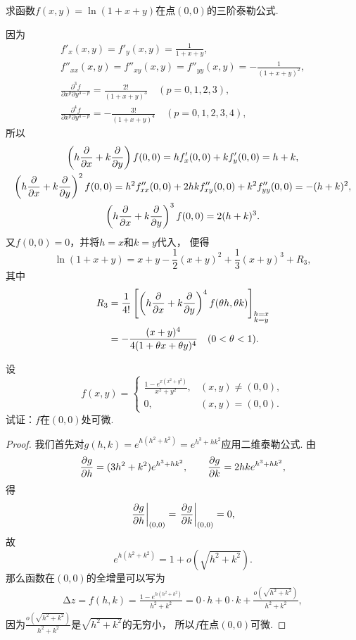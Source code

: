 \begin{example}
求函数\(f(x,y) = \ln(1+x+y)\)在点\((0,0)\)的三阶泰勒公式.
\begin{solution}
\def\oprt#1{\left(h\pdv{x}+k\pdv{y}\right)\ifx\relax#1\relax\else^{#1}\fi}
因为\begin{gather*}
	f'_x(x,y) = f'_y(x,y) = \frac{1}{1+x+y}, \\
	f''_{xx}(x,y) = f''_{xy}(x,y) = f''_{yy}(x,y) = -\frac{1}{(1+x+y)^2}, \\
	\frac{\partial^3 f}{\partial x^p \partial y^{3-p}}
	= \frac{2!}{(1+x+y)^3}
	\quad(p=0,1,2,3), \\
	\frac{\partial^4 f}{\partial x^p \partial y^{4-p}}
	= -\frac{3!}{(1+x+y)^4}
	\quad(p=0,1,2,3,4),
\end{gather*}
所以\begin{gather*}
	\oprt{} f(0,0)
	= h f'_x(0,0) + k f'_y(0,0)
	= h+k, \\
	\oprt{2} f(0,0)
	= h^2 f''_{xx}(0,0) + 2hk f''_{xy}(0,0) + k^2 f''_{yy}(0,0)
	= -(h+k)^2, \\
	\oprt{3} f(0,0)
	= 2(h+k)^3.
\end{gather*}
又\(f(0,0) = 0\)，并将\(h=x\)和\(k=y\)代入，
便得\[
	\ln(1+x+y) = x+y-\frac{1}{2}(x+y)^2+\frac{1}{3}(x+y)^3+R_3,
\]
其中\begin{align*}
	R_3
	&= \frac{1}{4!} \left[\oprt{4} f(\theta h,\theta k)\right]_{\substack{h=x\\k=y}} \\
	&= -\frac{(x+y)^4}{4(1+\theta x+\theta y)^4}
	\quad(0<\theta<1).
\end{align*}
\end{solution}
\end{example}

\begin{example}
设\[
	f(x,y) = \begin{cases}
		\frac{1 - e^{x(x^2+y^2)}}{x^2+y^2}, & (x,y)\neq(0,0), \\
		0, & (x,y)=(0,0).
	\end{cases}
\]试证：\(f\)在\((0,0)\)处可微.
\begin{proof}
我们首先对\(g(h,k) = e^{h(h^2+k^2)} = e^{h^3+hk^2}\)应用二维泰勒公式.
由\[
	\pdv{g}{h} = (3h^2+k^2)e^{h^3+hk^2}, \qquad
	\pdv{g}{k} = 2hke^{h^3+hk^2},
\]得\[
	\eval{\pdv{g}{h}}_{(0,0)}
	= \eval{\pdv{g}{k}}_{(0,0)}
	= 0,
\]
故\[
	e^{h(h^2+k^2)} = 1 + o(\sqrt{h^2+k^2}).
\]
那么函数在\((0,0)\)的全增量可以写为
\begin{align*}
	\increment z
	= f(h,k)
	= \frac{1 - e^{h(h^2+k^2)}}{h^2+k^2}
	= 0 \cdot h + 0 \cdot k + \frac{o(\sqrt{h^2+k^2})}{h^2+k^2},
\end{align*}
因为\(\frac{o(\sqrt{h^2+k^2})}{h^2+k^2}\)是\(\sqrt{h^2+k^2}\)的无穷小，
所以\(f\)在点\((0,0)\)可微.
\end{proof}
\end{example}
